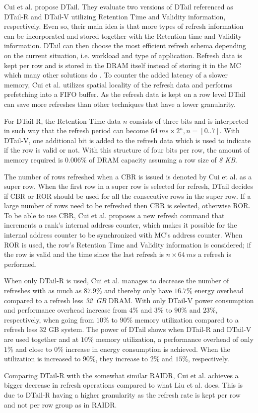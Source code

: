 Cui et al. \cite{dtail} propose DTail. They evaluate two versions of DTail referenced as DTail-R and DTail-V utilizing Retention Time and Validity information, respectively. Even so, their main idea is that more types of refresh information can be incorporated and stored together with the Retention time and Validity information. DTail can then choose the most efficient refresh schema depending on the current situation, i.e. workload and type of application. Refresh data is kept per row and is stored in the DRAM itself instead of storing it in the MC which many other solutions do \cite{raidr}\cite{smartrefresh}\cite{refrint}. To counter the added latency of a slower memory, Cui et al. utilizes spatial locality of the refresh data and performs prefetching into a FIFO buffer. As the refresh data is kept on a row level DTail can save more refreshes than other techniques that have a lower granularity.

For DTail-R, the Retention Time data $n$ consists of three bits and is interpreted in such way that the refresh period can become \(64\:ms \times 2^n, n = [0..7]\). With DTail-V, one additional bit is added to the refresh data which is used to indicate if the row is valid or not. With this structure of four bits per row, the amount of memory required is $0.006\%$ of DRAM capacity assuming a row size of \textit{8 KB}.

The number of rows refreshed when a CBR is issued is denoted by Cui et al. as a super row. When the first row in a super row is selected for refresh, DTail decides if CBR or ROR should be used for all the consecutive rows in the super row. If a large number of rows need to be refreshed then CBR is selected, otherwise ROR. To be able to use CBR, Cui et al. proposes a new refresh command that increments a rank's internal address counter, which makes it possible for the internal address counter to be synchronized with MC's address counter. When ROR is used, the row's Retention Time and Validity information is considered; if the row is valid and the time since the last refresh is $n \times 64\:ms$ a refresh is performed. 

When only DTail-R is used, Cui et al. manages to decrease the number of refreshes with as much as $87.9\%$ and thereby only have $16.7\%$ energy overhead compared to a refresh less \textit{32~GB} DRAM. With only DTail-V power consumption and performance overhead increase from $4\%$ and $3\%$ to $90\%$ and $23\%$, respectively, when going from $10\%$ to $90\%$ memory utilization compared to a refresh less 32 GB system. The power of DTail shows when DTail-R and DTail-V are used together and at $10\%$ memory utilization, a performance overhead of only $1\%$ and close to $0\%$ increase in energy consumption is achieved. When the utilization is increased to $90\%$, they increase to $2\%$ and $15\%$, respectively.

Comparing DTail-R with the somewhat similar RAIDR, Cui et al. achieves a bigger decrease in refresh operations compared to what Liu et al. does. This is due to DTail-R having a higher granularity as the refresh rate is kept per row and not per row group as in RAIDR.